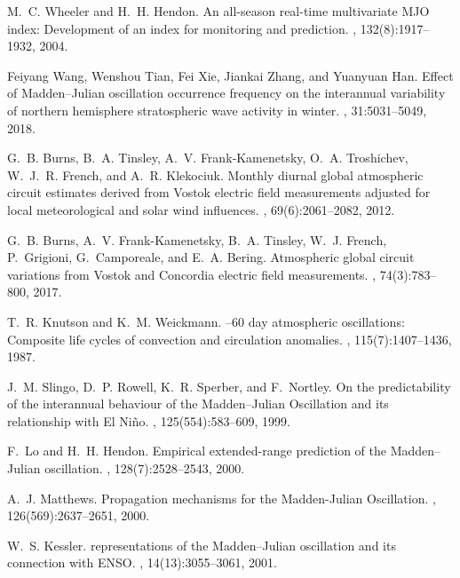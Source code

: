 \documentclass[12pt, russian, a4paper]{article}
\begin{document}
\begin{thebibliography}{10}
M.~C. Wheeler and H.~H. Hendon.
\newblock An all-season real-time multivariate {MJO} index: Development of an
  index for monitoring and prediction.
, 132(8):1917--1932, 2004.

Feiyang Wang, Wenshou Tian, Fei Xie, Jiankai Zhang, and Yuanyuan Han.
\newblock Effect of {M}adden–{J}ulian oscillation occurrence frequency on the
  interannual variability of northern hemisphere stratospheric wave activity in
  winter.
, 31:5031--5049, 2018.

G.~B. Burns, B.~A. Tinsley, A.~V. Frank‐Kamenetsky, O.~A. Troshichev,
  W.~J.~R. French, and A.~R. Klekociuk.
\newblock Monthly diurnal global atmospheric circuit estimates derived from
  {V}ostok electric field measurements adjusted for local meteorological and
  solar wind influences.
, 69(6):2061--2082, 2012.

G.~B. Burns, A.~V. Frank-Kamenetsky, B.~A. Tinsley, W.~J. French, P.~Grigioni,
  G.~Camporeale, and E.~A. Bering.
\newblock Atmospheric global circuit variations from {V}ostok and {C}oncordia
  electric field measurements.
, 74(3):783--800, 2017.

T.~R. Knutson and K.~M. Weickmann.
–60 day atmospheric oscillations: Composite life cycles of
  convection and circulation anomalies.
, 115(7):1407--1436, 1987.

J.~M. Slingo, D.~P. Rowell, K.~R. Sperber, and F.~Nortley.
\newblock On the predictability of the interannual behaviour of the
  {M}adden–{J}ulian {O}scillation and its relationship with {E}l {N}iño.
, 125(554):583--609, 1999.

F.~Lo and H.~H. Hendon.
\newblock Empirical extended-range prediction of the {M}adden–{J}ulian
  oscillation.
, 128(7):2528--2543, 2000.

A.~J. Matthews.
\newblock Propagation mechanisms for the {M}adden-{J}ulian {O}scillation.
, 126(569):2637--2651, 2000.

W.~S. Kessler.
 representations of the {M}adden–{J}ulian oscillation and its
  connection with {ENSO}.
, 14(13):3055--3061, 2001.


\end{thebibliography}
\end{document}
